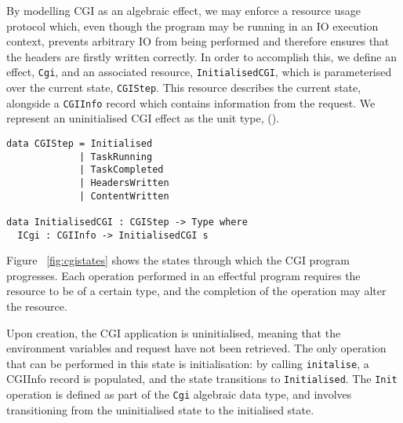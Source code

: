 \documentclass[preprint]{sigplanconf}
\begin{document}
By modelling CGI as an algebraic effect, we may enforce a resource usage protocol which, even though the program may be running in an IO execution context, prevents arbitrary IO from being performed and therefore ensures that the headers are firstly written correctly. In order to accomplish this, we define an effect, \texttt{Cgi}, and an associated resource, \texttt{InitialisedCGI}, which is parameterised over the current state, \texttt{CGIStep}. This resource describes the current state, alongside a \texttt{CGIInfo} record which contains information from the request. We represent an uninitialised CGI effect as the unit type, ().
{\small
\begin{verbatim}
data CGIStep = Initialised 
             | TaskRunning 
             | TaskCompleted 
             | HeadersWritten 
             | ContentWritten

data InitialisedCGI : CGIStep -> Type where
  ICgi : CGIInfo -> InitialisedCGI s
\end{verbatim}
}
Figure ~\ref{fig:cgistates} shows the states through which the CGI program progresses. Each operation performed in an effectful program requires the resource to be of a certain type, and the completion of the operation may alter the resource.

Upon creation, the CGI application is uninitialised, meaning that the environment variables and request have not been retrieved. The only operation that can be performed in this state is initialisation: by calling \texttt{initalise}, a CGIInfo record is populated, and the state transitions to \texttt{Initialised}. The \texttt{Init} operation is defined as part of the \texttt{Cgi} algebraic data type, and involves transitioning from the uninitialised state to the initialised state.
\end{document}

